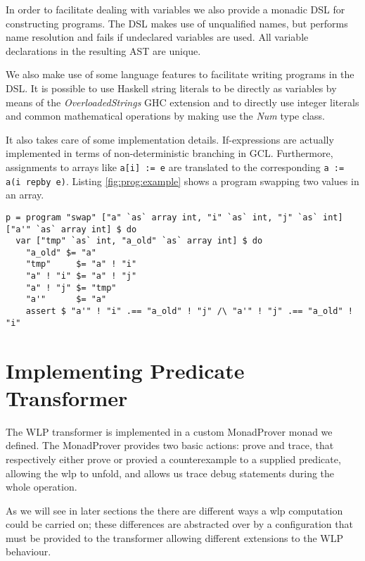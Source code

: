\documentclass[]{scrartcl}
\begin{document}
In order to facilitate dealing with variables we also provide a monadic DSL for constructing programs.
The DSL makes use of unqualified names, but performs name resolution and fails if undeclared variables
are used. All variable declarations in the resulting AST are unique.

We also make use of some language features to facilitate writing programs in the DSL.
It is possible to use Haskell string literals to be directly as variables by means of the
\emph{OverloadedStrings} GHC extension and to directly use integer literals and common mathematical
operations by making use the \emph{Num} type class.

It also takes care of some implementation details. If-expressions are actually implemented in terms of
non-deterministic branching in GCL. Furthermore, assignments to arrays like
\lstinline|a[i] := e| are translated to the corresponding \lstinline|a := a(i repby e)|.
Listing \ref{fig:prog:example} shows a program swapping two values in an array.

\begin{lstlisting}[caption=A program swapping the values at two indices in an array, label=fig:prog:example]
p = program "swap" ["a" `as` array int, "i" `as` int, "j" `as` int] ["a'" `as` array int] $ do
  var ["tmp" `as` int, "a_old" `as` array int] $ do
    "a_old" $= "a"
    "tmp"     $= "a" ! "i"
    "a" ! "i" $= "a" ! "j"
    "a" ! "j" $= "tmp"
    "a'"      $= "a"
    assert $ "a'" ! "i" .== "a_old" ! "j" /\ "a'" ! "j" .== "a_old" ! "i"
\end{lstlisting}

\section{Implementing Predicate Transformer}

The WLP transformer is implemented in a custom MonadProver monad we defined.
The MonadProver provides two basic actions: prove and trace, that respectively
either prove or provied a counterexample to a supplied predicate, allowing the
wlp to unfold, and allows us trace debug statements during the whole operation.

As we will see in later sections the there are different ways a wlp computation
could be carried on; these differences are abstracted over by a configuration
that must be provided to the transformer allowing different extensions to the
WLP behaviour.
\end{document}
